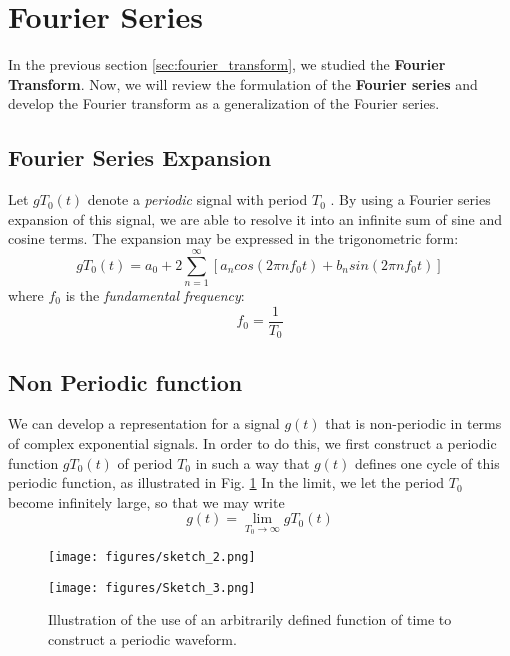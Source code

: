 \documentclass{article}
\begin{document}
\section{Fourier Series}
In the previous section \ref{sec:fourier_transform}, we studied the \textbf{Fourier Transform}. Now, we will review the formulation of the \textbf{Fourier series} and develop the Fourier
transform as a generalization of the Fourier series.

\subsection{Fourier Series Expansion}
Let $gT_0(t)$ denote a \textit{periodic} signal with period $T_0$ . By using a Fourier series expansion of 
this signal, we are able to resolve it into an infinite sum of sine and cosine terms.
The expansion may be expressed in the trigonometric form:
\begin{equation}
    gT_0(t) = a_0 + 2 \sum_{n=1}^{\infty} [ a_n cos(2\pi n f_0 t) + b_n sin(2\pi n f_0 t)]
\end{equation}
where $ f_0$ is the \textit{fundamental frequency}: 
\begin{equation}
    f_0 = \frac{1}{T_0}
\end{equation}

\subsection{Non Periodic function}
We can develop a  representation for a signal $g(t)$   that is non-periodic in terms of complex exponential signals. 
In order to do this, we first construct a periodic function $ gT_0(t)$ of period $ T_0 $ in such a way
that $g(t)$ defines one cycle of this periodic function, as illustrated in Fig. \ref{fig:figu}
In the limit, we let the period $T_0 $ become infinitely large, so that we may
write
\begin{equation}
    g(t) =  \lim_{T_0\to\infty} gT_0(t)
\end{equation}

\begin{figure}[h!]
 
\texttt{[image: figures/sketch\_2.png]} 
\label{fig:f2}

\texttt{[image: figures/Sketch\_3.png]}
\label{fig:f3}
 
\caption{Illustration of the use of an arbitrarily defined function of time to construct
a periodic waveform.}
\label{fig:figu}

\end{figure}
\newpage
\end{document}
